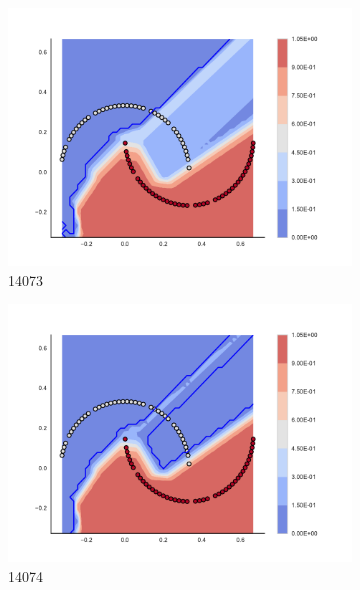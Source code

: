 \begin{figure}[h]
\begin{subfigure}[b]{0.09\textwidth}
    \includegraphics[clip, trim=2.35cm 1.75cm 4.5cm 0cm,width=\textwidth]{img/convergence/14073.pdf}
    \caption{14073}
    \label{fig:convergence_14073}
\end{subfigure}
%
\begin{subfigure}[b]{0.09\textwidth}
    \includegraphics[clip, trim=2.35cm 1.75cm 4.5cm 0cm,width=\textwidth]{img/convergence/14074.pdf}
    \caption{14074}
    \label{fig:convergence_14074}
\end{subfigure}
%
\begin{subfigure}[b]{0.09\textwidth}

\end{subfigure}
\end{figure}
